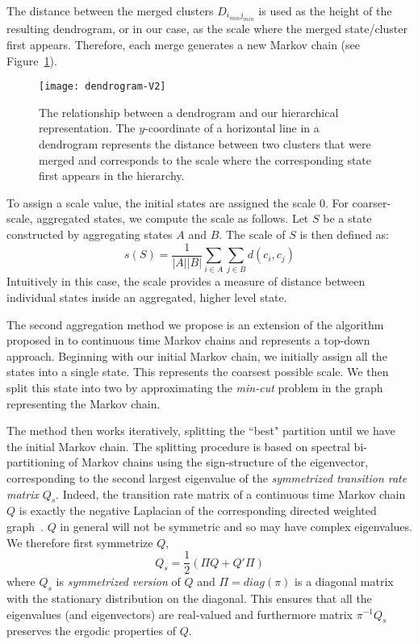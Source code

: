 The distance between the merged clusters $D_{i_{min} j_{min}}$ is used as the height of the resulting dendrogram, or in our case, as the scale where the merged state/cluster first appears. Therefore, each merge generates a new Markov chain (see Figure~\ref{fig:dendrogram}).%
\begin{figure}[h!]
	\centering
	\texttt{[image: dendrogram-V2]}
	\caption{The relationship between a dendrogram and our hierarchical representation. The $y$-coordinate of a horizontal line in a dendrogram represents the distance between two clusters that were merged and corresponds to the scale where the corresponding state first appears in the hierarchy.}
	\label{fig:dendrogram}
\end{figure}
%
To assign a scale value, the initial states are assigned the scale $0$. For coarser-scale, aggregated states, we compute the scale as follows. Let $S$ be a state constructed by aggregating states $A$ and $B$.  The scale of $S$ is then defined as:
\begin{equation}
	\nonumber
	s(S) = \frac{1}{\left|A\right|\left|B\right|}\sum\limits_{i \in A}\sum\limits_{j \in B} d(c_i,c_j)
\end{equation}
Intuitively in this case, the scale provides a measure of distance between individual states inside an aggregated, higher level state.


The second aggregation method we propose is an extension of the algorithm proposed in \cite{5746509} to continuous time Markov chains and represents a top-down approach. Beginning with our initial Markov chain, we initially assign all the states into a single state. This represents the coarsest possible scale. We then split this state into two by approximating the \emph{min-cut} problem in the graph representing the Markov chain. 

The method then works iteratively, splitting the ``best" partition until we have the initial Markov chain.
%
The splitting procedure is based on spectral bi-partitioning of Markov chains using the sign-structure of the eigenvector, corresponding to the second largest eigenvalue of the \emph{symmetrized transition rate matrix} $Q_s$. Indeed,  the transition rate matrix of a continuous time Markov chain $Q$ is exactly the negative Laplacian of the corresponding directed weighted graph~\cite{Agaev2005157}.
%
$Q$ in general will not be symmetric and so may have complex eigenvalues. We therefore first symmetrize $Q$,
\begin{equation}
	\nonumber
	Q_s = \frac{1}{2}(\Pi Q + Q' \Pi)
\end{equation}
where $Q_s$ is \emph{symmetrized version} of $Q$ and $\Pi = diag(\pi)$ is a diagonal matrix with the stationary distribution on the diagonal. This ensures that all the eigenvalues (and eigenvectors) are real-valued and furthermore matrix $\pi^{-1}Q_s$ preserves the ergodic properties of $Q$. 

